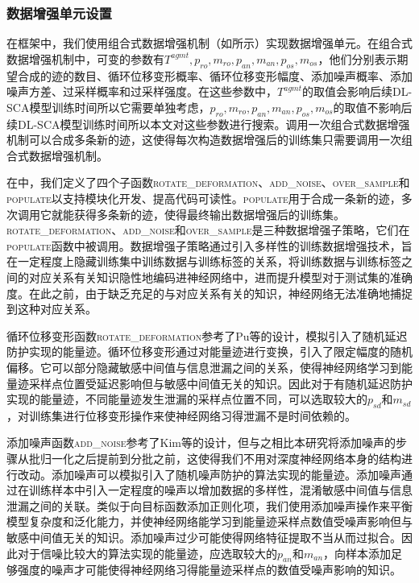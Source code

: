 {	\subsubsection{数据增强单元设置}\label{subss:cdasettings}
	在框架中，我们使用组合式数据增强机制（如所示）实现数据增强单元。在组合式数据增强机制中，可变的参数有$T^{agmt},p_{ro},m_{ro},p_{an},m_{an},p_{os},m_{os}$，他们分别表示期望合成的迹的数目、循环位移变形概率、循环位移变形幅度、添加噪声概率、添加噪声方差、过采样概率和过采样强度。在这些参数中，$T^{agmt}$的取值会影响后续DL-SCA模型训练时间所以它需要单独考虑，$p_{ro},m_{ro},p_{an},m_{an},p_{os},m_{os}$的取值不影响后续DL-SCA模型训练时间所以本文对这些参数进行搜索。调用一次组合式数据增强机制可以合成多条新的迹，这使得每次构造数据增强后的训练集只需要调用一次组合式数据增强机制。
	
	在中，我们定义了四个子函数\textsc{rotate\_deformation}、\textsc{add\_noise}、\textsc{over\_sample}和\textsc{populate}以支持模块化开发、提高代码可读性。\textsc{populate}用于合成一条新的迹，多次调用它就能获得多条新的迹，使得最终输出数据增强后的训练集。\textsc{rotate\_deformation}、\textsc{add\_noise}和\textsc{over\_sample}是三种数据增强子策略，它们在\textsc{populate}函数中被调用。数据增强子策略通过引入多样性的训练数据增强技术，旨在一定程度上隐藏训练集中训练数据与训练标签的关系，将训练数据与训练标签之间的对应关系有关知识隐性地编码进神经网络中，进而提升模型对于测试集的准确度。在此之前，由于缺乏充足的与对应关系有关的知识，神经网络无法准确地捕捉到这种对应关系。
	
	循环位移变形函数\textsc{rotate\_deformation}参考了Pu等\citep{Pu17}的设计，模拟引入了随机延迟防护实现的能量迹。循环位移变形通过对能量迹进行变换，引入了限定幅度的随机偏移。它可以部分隐藏敏感中间值与信息泄漏之间的关系，使得神经网络学习到能量迹采样点位置受延迟影响但与敏感中间值无关的知识。因此对于有随机延迟防护实现的能量迹，不同能量迹发生泄漏的采样点位置不同，可以选取较大的$p_{sd}$和$m_{sd}$，对训练集进行位移变形操作来使神经网络习得泄漏不是时间依赖的。
	
	添加噪声函数\textsc{add\_noise}参考了Kim等\citep{Kim19}的设计，但与之相比本研究将添加噪声的步骤从批归一化之后提前到分批之前，这使得我们不用对深度神经网络本身的结构进行改动。添加噪声可以模拟引入了随机噪声防护的算法实现的能量迹。添加噪声通过在训练样本中引入一定程度的噪声以增加数据的多样性，混淆敏感中间值与信息泄漏之间的关联。类似于向目标函数添加正则化项，我们使用添加噪声操作来平衡模型复杂度和泛化能力，并使神经网络能学习到能量迹采样点数值受噪声影响但与敏感中间值无关的知识。添加噪声过少可能使得网络特征提取不当从而过拟合。因此对于信噪比较大的算法实现的能量迹，应选取较大的$p_{an}$和$m_{an}$，向样本添加足够强度的噪声才可能使得神经网络习得能量迹采样点的数值受噪声影响的知识。
	
}
